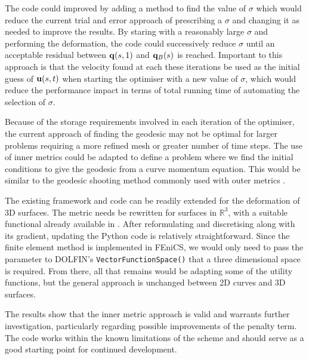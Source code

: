 \documentclass[a4paper, 12pt]{article}
\begin{document}
The code could improved by adding a method to find the value of
$\sigma$ which would reduce the current trial and error approach of prescribing a
$\sigma$ and changing it as needed to improve the results. By staring with a
reasonably large $\sigma$ and performing the deformation, the code could
successively reduce $\sigma$ until an acceptable residual between $\mathbf{q}(s,1)$ and
$\mathbf{q}_B(s)$ is reached. Important to this approach is that the velocity found at each these iterations  be used as
the initial guess of $\mathbf{u}(s,t)$  when starting the
optimiser with a new value of $\sigma$, which would reduce the performance
impact in terms of total running time of automating the selection of $\sigma$.

Because of the storage requirements involved in each iteration of the optimiser,
the current approach of finding the geodesic may not be optimal for larger
problems requiring a more refined mesh or greater number of time steps. The use of inner
metrics could be adapted to define a problem where we find the initial
conditions to give the geodesic from a curve momentum equation. This would be
similar to the geodesic shooting method commonly used with outer metrics
\cite{miller2006geodesic, cotter2009geodesic, clark2011reparam}.

The existing framework and code can be readily extended for the deformation of
3D surfaces. The metric  needs be rewritten for surfaces in
$\mathbb{R}^3$, with a suitable functional already available in
\cite{bauer2011new}. After reformulating and discretising  along with its
gradient, updating the Python code is relatively straightforward. Since the
finite element method is implemented in FEniCS, we would only need to pass the
parameter to DOLFIN's \texttt{VectorFunctionSpace()} that a three dimensional space
is required. From there, all that remains would be adapting some of the utility
functions, but the general approach is unchanged between 2D curves and 3D
surfaces.


The results show that the inner metric approach is valid and warrants further
investigation, particularly regarding possible improvements of the penalty
term. The code works within the known limitations of the scheme and should serve as
a good starting point for continued development.


\newpage
{}

{}
\end{document}

